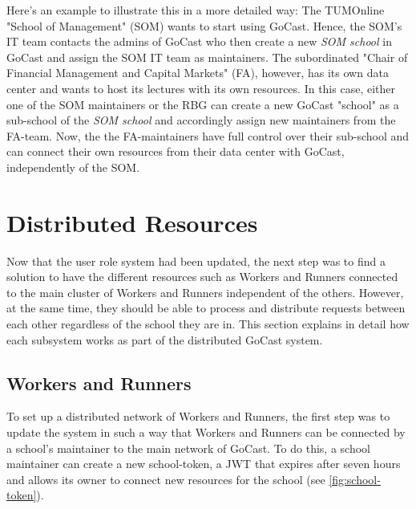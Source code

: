 Here's an example to illustrate this in a more detailed way:
The TUMOnline "School of Management" (SOM) wants to start using GoCast. Hence, the SOM's IT team contacts the admins of GoCast who then create a new \textit{SOM school} in GoCast and assign the SOM IT team as maintainers.
The subordinated "Chair of Financial Management and Capital Markets" (FA), however, has its own data center and wants to host its lectures with its own resources. In this case, either one of the SOM maintainers or the RBG can create a new GoCast "school" as a sub-school of the \textit{SOM school} and accordingly assign new maintainers from the FA-team. Now, the the FA-maintainers have full control over their sub-school and can connect their own resources from their data center with GoCast, independently of the SOM.











\section{Distributed Resources}

Now that the user role system had been updated, the next step was to find a solution to have the different resources such as Workers and Runners connected to the main cluster of Workers and Runners independent of the others. However, at the same time, they should be able to process and distribute requests between each other regardless of the school they are in. This section explains in detail how each subsystem works as part of the distributed GoCast system. 

\subsection{Workers and Runners}
To set up a distributed network of Workers and Runners, the first step was to update the system in such a way that Workers and Runners can be connected by a school's maintainer to the main network of GoCast. To do this, a school maintainer can create a new school-token, a \ac{JWT} that expires after seven hours and allows its owner to connect new resources for the school (see \autoref{fig:school-token}).

